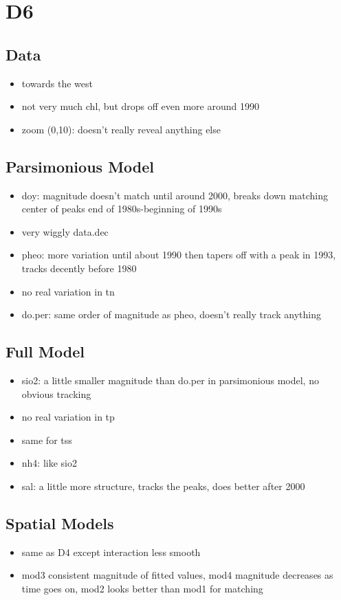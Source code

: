 \documentclass[12pt]{amsart}
\begin{document}
\section{D6}
\subsection{Data}
\begin{itemize}
\item towards the west
\item not very much chl, but drops off even more around 1990
\item zoom (0,10): doesn't really reveal anything else
\end{itemize}
\subsection{Parsimonious Model}
\begin{itemize}
\item doy: magnitude doesn't match until around 2000, breaks down matching center of peaks end of 1980s-beginning of 1990s
\item very wiggly data.dec
\item pheo: more variation until about 1990 then tapers off with a peak in 1993, tracks decently before 1980
\item no real variation in tn
\item do.per: same order of magnitude as pheo, doesn't really track anything
\end{itemize}
\subsection{Full Model}
\begin{itemize}
\item sio2: a little smaller magnitude than do.per in parsimonious model, no obvious tracking
\item no real variation in tp
\item same for tss
\item nh4: like sio2
\item sal: a little more structure, tracks the peaks, does better after 2000
\end{itemize}

\subsection{Spatial Models}

\begin{itemize}
\item same as D4 except interaction less smooth
\item mod3 consistent magnitude of fitted values, mod4 magnitude decreases as time goes on, mod2 looks better than mod1 for matching
\end{itemize}
\end{document}
